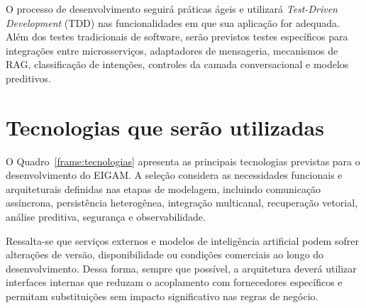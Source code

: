 O processo de desenvolvimento seguirá práticas ágeis e utilizará \textit{Test-Driven Development} (TDD) nas funcionalidades em que sua aplicação for adequada. Além dos testes tradicionais de software, serão previstos testes específicos para integrações entre microsserviços, adaptadores de mensageria, mecanismos de RAG, classificação de intenções, controles da camada conversacional e modelos preditivos.

\section{Tecnologias que serão utilizadas}

O Quadro~\ref{frame:tecnologias} apresenta as principais tecnologias previstas para o desenvolvimento do EIGAM. A seleção considera as necessidades funcionais e arquiteturais definidas nas etapas de modelagem, incluindo comunicação assíncrona, persistência heterogênea, integração multicanal, recuperação vetorial, análise preditiva, segurança e observabilidade.

Ressalta-se que serviços externos e modelos de inteligência artificial podem sofrer alterações de versão, disponibilidade ou condições comerciais ao longo do desenvolvimento. Dessa forma, sempre que possível, a arquitetura deverá utilizar interfaces internas que reduzam o acoplamento com fornecedores específicos e permitam substituições sem impacto significativo nas regras de negócio.

